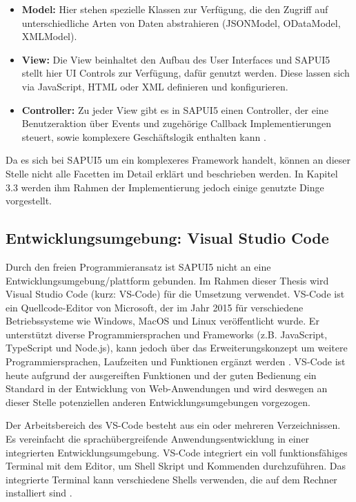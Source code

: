 \begin{itemize}[noitemsep]
\item \textbf{Model:} Hier stehen spezielle Klassen zur Verfügung, die den Zugriff auf unterschiedliche Arten von Daten abstrahieren (JSONModel, ODataModel, XMLModel).
\item \textbf{View:} Die View beinhaltet den Aufbau des User Interfaces und SAPUI5 stellt hier UI Controls zur Verfügung, dafür genutzt werden. Diese lassen sich via JavaScript, HTML oder XML definieren und konfigurieren.
\item \textbf{Controller:} Zu jeder View gibt es in SAPUI5 einen Controller, der eine Benutzeraktion über Events und zugehörige Callback Implementierungen steuert, sowie komplexere Geschäftslogik enthalten kann \cite[S.149]{sapui5}.
\end{itemize}

Da es sich bei SAPUI5 um ein komplexeres Framework handelt, können an dieser Stelle nicht alle Facetten im Detail erklärt und beschrieben werden. In Kapitel 3.3 werden ihm Rahmen der Implementierung jedoch einige genutzte Dinge vorgestellt.

\subsection{Entwicklungsumgebung: Visual Studio Code}
Durch den freien Programmieransatz ist SAPUI5 nicht an eine Entwicklungsumgebung/plattform gebunden. Im Rahmen dieser Thesis wird Visual Studio Code (kurz: VS-Code) für die Umsetzung verwendet. VS-Code ist ein Quellcode-Editor von Microsoft, der im Jahr 2015 für verschiedene Betriebssysteme wie Windows, MacOS und Linux veröffentlicht wurde. Er unterstützt diverse Programmiersprachen und Frameworks (z.B. JavaScript, TypeScript und Node.js), kann jedoch über das Erweiterungskonzept um weitere Programmiersprachen, Laufzeiten und Funktionen ergänzt werden \cite{vsc:ov}. VS-Code ist heute aufgrund der ausgereiften Funktionen und der guten Bedienung ein Standard in der Entwicklung von Web-Anwendungen \cite{wiki:vsc} und wird deswegen an dieser Stelle potenziellen anderen Entwicklungsumgebungen vorgezogen.

Der Arbeitsbereich des VS-Code besteht aus ein oder mehreren Verzeichnissen. Es vereinfacht die sprachübergreifende Anwendungsentwicklung in einer integrierten Entwicklungsumgebung. VS-Code integriert ein voll funktionsfähiges Terminal mit dem Editor, um Shell Skript und Kommenden durchzuführen. Das integrierte Terminal kann verschiedene Shells verwenden, die auf dem Rechner installiert sind \cite{vsc:tb}.

